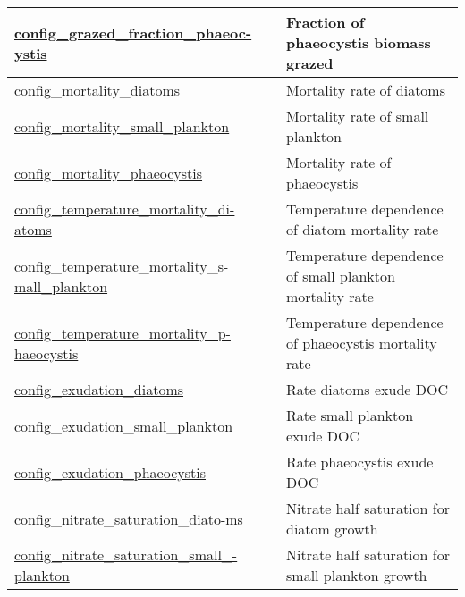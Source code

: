 {\begin{center}
\begin{longtable}{| p{2.0in} || p{4.0in} |}
    \hline
    \hyperref[subsec:nm_sec_config_grazed_fraction_phaeocystis]{config\_grazed\_fraction\_phaeoc-}\hyperref[subsec:nm_sec_config_grazed_fraction_phaeocystis]{ystis}& Fraction of phaeocystis biomass grazed \\
    \hline
    \hyperref[subsec:nm_sec_config_mortality_diatoms]{config\_mortality\_diatoms} & Mortality rate of diatoms \\
    \hline
    \hyperref[subsec:nm_sec_config_mortality_small_plankton]{config\_mortality\_small\_plankton} & Mortality rate of small plankton \\
    \hline
    \hyperref[subsec:nm_sec_config_mortality_phaeocystis]{config\_mortality\_phaeocystis} & Mortality rate of phaeocystis \\
    \hline
    \hyperref[subsec:nm_sec_config_temperature_mortality_diatoms]{config\_temperature\_mortality\_di-}\hyperref[subsec:nm_sec_config_temperature_mortality_diatoms]{atoms}& Temperature dependence of diatom mortality rate \\
    \hline
    \hyperref[subsec:nm_sec_config_temperature_mortality_small_plankton]{config\_temperature\_mortality\_s-}\hyperref[subsec:nm_sec_config_temperature_mortality_small_plankton]{mall\_plankton}& Temperature dependence of small plankton mortality rate \\
    \hline
    \hyperref[subsec:nm_sec_config_temperature_mortality_phaeocystis]{config\_temperature\_mortality\_p-}\hyperref[subsec:nm_sec_config_temperature_mortality_phaeocystis]{haeocystis}& Temperature dependence of phaeocystis mortality rate \\
    \hline
    \hyperref[subsec:nm_sec_config_exudation_diatoms]{config\_exudation\_diatoms} & Rate diatoms exude DOC \\
    \hline
    \hyperref[subsec:nm_sec_config_exudation_small_plankton]{config\_exudation\_small\_plankton} & Rate small plankton exude DOC \\
    \hline
    \hyperref[subsec:nm_sec_config_exudation_phaeocystis]{config\_exudation\_phaeocystis} & Rate phaeocystis exude DOC \\
    \hline
    \hyperref[subsec:nm_sec_config_nitrate_saturation_diatoms]{config\_nitrate\_saturation\_diato-}\hyperref[subsec:nm_sec_config_nitrate_saturation_diatoms]{ms}& Nitrate half saturation for diatom growth \\
    \hline
    \hyperref[subsec:nm_sec_config_nitrate_saturation_small_plankton]{config\_nitrate\_saturation\_small\_-}\hyperref[subsec:nm_sec_config_nitrate_saturation_small_plankton]{plankton}& Nitrate half saturation for small plankton growth \\

\end{longtable}
\end{center}}
